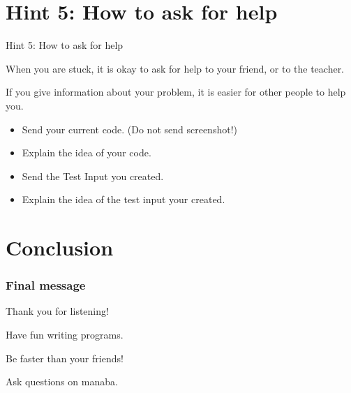
\section{Hint 5: How to ask for help}

\begin{frame}{Hint 5: How to ask for help}
  \begin{block}{}
  When you are stuck, it is okay to ask for help to your friend, or to the teacher.\medskip

  If you give information about your problem, it is easier for other people to help you.
  \end{block}\bigskip

  \begin{itemize}
    \item Send your current code. (Do not send screenshot!)\medskip

    \item Explain the idea of your code.\medskip

    \item Send the Test Input you created.\medskip

    \item Explain the idea of the test input your created.
  \end{itemize}
\end{frame}

\section{Conclusion}

\begin{frame}\frametitle{Final message}
  Thank you for listening!\vfill

  Have fun writing programs.\vfill

  Be faster than your friends!\vfill

  Ask questions on manaba.
\end{frame}
